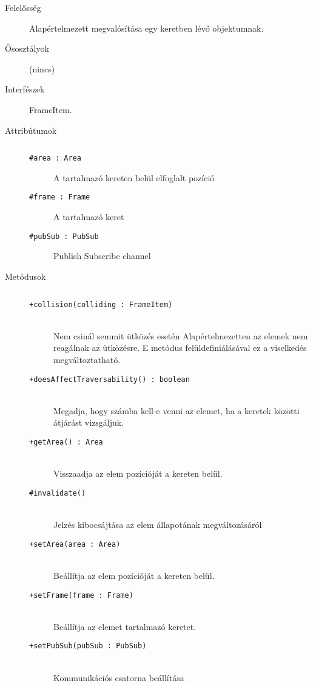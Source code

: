 			\begin{description}

				\item[Felelősség] Alapértelmezett megvalósítása egy keretben lévő objektumnak.

				\item[Ősosztályok] (nincs)
				\item[Interfészek] FrameItem.
				\item[Attribútumok]$\ $
					\begin{description}
						\item[\texttt{\#area : Area}]A tartalmazó kereten belül elfoglalt pozíció
						\item[\texttt{\#frame : Frame}]A tartalmazó keret
						\item[\texttt{\#pubSub : PubSub}]Publish Subscribe channel
					\end{description}
				\item[Metódusok]$\ $
					\begin{description}
						\item[\texttt{+collision(colliding : FrameItem)}] \hfill \\Nem csinál semmit ütközés esetén    Alapértelmezetten az elemek nem reagálnak az ütközésre.  E metódus felüldefiniálásával ez a viselkedés megváltoztatható. 
						\item[\texttt{+doesAffectTraversability() : boolean}] \hfill \\Megadja, hogy számba kell-e venni az elemet,  ha a keretek közötti átjárást vizsgáljuk. 
						\item[\texttt{+getArea() : Area}] \hfill \\Visszaadja az elem pozícióját a kereten belül. 
						\item[\texttt{\#invalidate()}] \hfill \\Jelzés kibocsájtása az elem állapotának megváltozásáról 
						\item[\texttt{+setArea(area : Area)}] \hfill \\Beállítja az elem pozícióját a kereten belül. 
						\item[\texttt{+setFrame(frame : Frame)}] \hfill \\Beállítja az elemet tartalmazó keretet. 
						\item[\texttt{+setPubSub(pubSub : PubSub)}] \hfill \\Kommunikációs csatorna beállítása 
					\end{description}
			\end{description}

